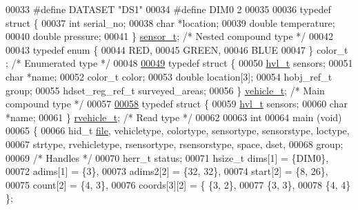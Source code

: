 \begin{DoxyCode}
00033 \textcolor{preprocessor}{#define DATASET         "DS1"}
00034 \textcolor{preprocessor}{#define DIM0            2}
00035 
00036 \textcolor{keyword}{typedef} \textcolor{keyword}{struct }\{
00037     \textcolor{keywordtype}{int}     serial\_no;
00038     \textcolor{keywordtype}{char}    *location;
00039     \textcolor{keywordtype}{double}  temperature;
00040     \textcolor{keywordtype}{double}  pressure;
00041 \} \hyperlink{structsensor__t}{sensor\_t};                                 \textcolor{comment}{/* Nested compound type */}
00042 
00043 \textcolor{keyword}{typedef} \textcolor{keyword}{enum} \{
00044     RED,
00045     GREEN,
00046     BLUE
00047 \} color\_t  ;                                \textcolor{comment}{/* Enumerated type */}
00048 
\hyperlink{structvehicle__t}{00049} \textcolor{keyword}{typedef} \textcolor{keyword}{struct }\{
00050     \hyperlink{structhvl__t}{hvl\_t}               sensors;
00051     \textcolor{keywordtype}{char}                *name;
00052     color\_t             color;
00053     \textcolor{keywordtype}{double}              location[3];
00054     hobj\_ref\_t          group;
00055     hdset\_reg\_ref\_t     surveyed\_areas;
00056 \} \hyperlink{structvehicle__t}{vehicle\_t};                                \textcolor{comment}{/* Main compound type */}
00057 
\hyperlink{structrvehicle__t}{00058} \textcolor{keyword}{typedef} \textcolor{keyword}{struct }\{
00059     \hyperlink{structhvl__t}{hvl\_t}       sensors;
00060     \textcolor{keywordtype}{char}        *name;
00061 \} \hyperlink{structrvehicle__t}{rvehicle\_t};                               \textcolor{comment}{/* Read type */}
00062 
00063 \textcolor{keywordtype}{int}
00064 main (\textcolor{keywordtype}{void})
00065 \{
00066     hid\_t       \hyperlink{structfile}{file}, vehicletype, colortype, sensortype, sensorstype, loctype,
00067                 strtype, rvehicletype, rsensortype, rsensorstype, space, dset,
00068                 group;
00069                                             \textcolor{comment}{/* Handles */}
00070     herr\_t      status;
00071     hsize\_t     dims[1] = \{DIM0\},
00072                 adims[1] = \{3\},
00073                 adims2[2] = \{32, 32\},
00074                 start[2] = \{8, 26\},
00075                 count[2] = \{4, 3\},
00076                 coords[3][2] = \{ \{3, 2\},
00077                                  \{3, 3\},
00078                                  \{4, 4\} \};

\end{DoxyCode}
